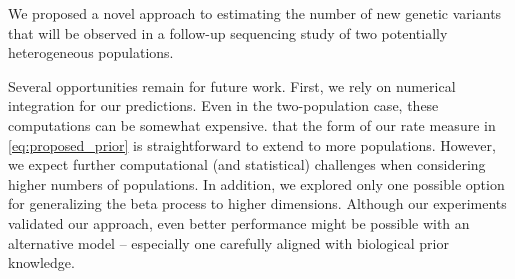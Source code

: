 We proposed a novel approach to estimating the number of new genetic variants that will be observed in a follow-up sequencing study of two potentially heterogeneous populations.

Several opportunities remain for future work. First, we rely on numerical integration for our predictions. Even in the two-population case, these computations can be somewhat expensive. 
 that the form of our rate measure in \cref{eq:proposed_prior} is straightforward to extend to more populations. However, 
we expect further computational (and statistical) challenges when considering higher numbers of populations. %
In addition, we explored only one possible option for generalizing the beta process to higher dimensions. Although our experiments validated our approach, even better performance might be possible with an alternative model -- especially one carefully aligned with biological prior knowledge. 
